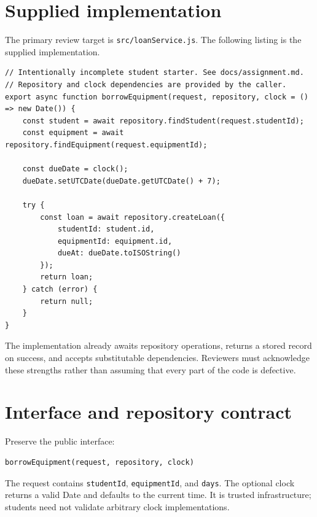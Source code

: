 \documentclass[
  11pt,
]{article}
\newcommand{\passthrough}[1]{#1}
\begin{document}
\hypertarget{supplied-implementation}{%
\section{Supplied implementation}\label{supplied-implementation}}

The primary review target is
\passthrough{\lstinline!src/loanService.js!}. The following listing is
the supplied implementation.

\begin{lstlisting}
// Intentionally incomplete student starter. See docs/assignment.md.
// Repository and clock dependencies are provided by the caller.
export async function borrowEquipment(request, repository, clock = () => new Date()) {
    const student = await repository.findStudent(request.studentId);
    const equipment = await repository.findEquipment(request.equipmentId);

    const dueDate = clock();
    dueDate.setUTCDate(dueDate.getUTCDate() + 7);

    try {
        const loan = await repository.createLoan({
            studentId: student.id,
            equipmentId: equipment.id,
            dueAt: dueDate.toISOString()
        });
        return loan;
    } catch (error) {
        return null;
    }
}
\end{lstlisting}

The implementation already awaits repository operations, returns a
stored record on success, and accepts substitutable dependencies.
Reviewers must acknowledge these strengths rather than assuming that
every part of the code is defective.

\hypertarget{interface-and-repository-contract}{%
\section{Interface and repository
contract}\label{interface-and-repository-contract}}

Preserve the public interface:

\begin{lstlisting}
borrowEquipment(request, repository, clock)
\end{lstlisting}

The request contains \passthrough{\lstinline!studentId!},
\passthrough{\lstinline!equipmentId!}, and
\passthrough{\lstinline!days!}. The optional clock returns a valid Date
and defaults to the current time. It is trusted infrastructure; students
need not validate arbitrary clock implementations.
\end{document}
